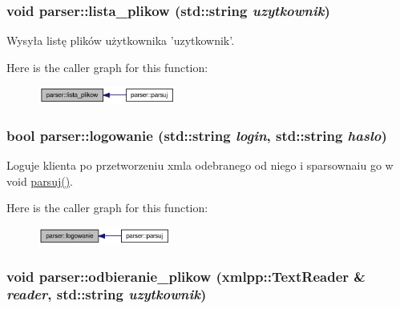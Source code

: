 \hypertarget{a00005_96f941201d172eeaf2fb4d8429edfc0c}{
\subsubsection[{lista\_\-plikow}]{\setlength{\rightskip}{0pt plus 5cm}void parser::lista\_\-plikow (std::string {\em uzytkownik})}}
\label{dd/dad/a00005_96f941201d172eeaf2fb4d8429edfc0c}


Wysyła listę plików użytkownika 'uzytkownik'. 



Here is the caller graph for this function:\nopagebreak
\begin{figure}[H]
\begin{center}
\leavevmode
\includegraphics[width=128pt]{dd/dad/a00005_96f941201d172eeaf2fb4d8429edfc0c_icgraph}
\end{center}
\end{figure}
\hypertarget{a00005_71abf468eb72a833dbd6c8a895b66b52}{
\subsubsection[{logowanie}]{\setlength{\rightskip}{0pt plus 5cm}bool parser::logowanie (std::string {\em login}, \/  std::string {\em haslo})}}
\label{dd/dad/a00005_71abf468eb72a833dbd6c8a895b66b52}


Loguje klienta po przetworzeniu xmla odebranego od niego i sparsownaiu go w void \hyperlink{a00005_9ce7290217bd14e4efcbe2cad32ccf95}{parsuj()}. 



Here is the caller graph for this function:\nopagebreak
\begin{figure}[H]
\begin{center}
\leavevmode
\includegraphics[width=124pt]{dd/dad/a00005_71abf468eb72a833dbd6c8a895b66b52_icgraph}
\end{center}
\end{figure}
\hypertarget{a00005_4e084ae10e8498b171c44a0138597d2e}{
\subsubsection[{odbieranie\_\-plikow}]{\setlength{\rightskip}{0pt plus 5cm}void parser::odbieranie\_\-plikow (xmlpp::TextReader \& {\em reader}, \/  std::string {\em uzytkownik})}}
\label{dd/dad/a00005_4e084ae10e8498b171c44a0138597d2e}


